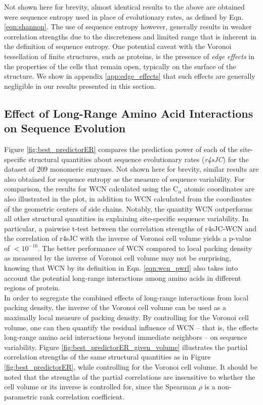 \documentclass[11pt]{article}
\begin{document}
    Not shown here for brevity, almost identical results to the above are obtained were sequence entropy used in place of evolutionary rates, as defined by Eqn. \ref{eqn:shannon}. The use of sequence entropy however, generally results in weaker correlation strengths due to the discreteness and limited range that is inherent in the definition of sequence entropy. One potential caveat with the Voronoi tessellation of finite structures, such as proteins, is the presence of {\it edge effects} in the properties of the cells that remain open, typically on the surface of the structure. We show in appendix \ref{app:edge_effects} that such effects are generally negligible in our results presented in this section. \\

    \subsection*{Effect of Long-Range Amino Acid Interactions on Sequence Evolution}
    \label{sec:long_range}
    Figure \ref{fig:best_predictorER} compares the prediction power of each of the site-specific structural quantities about sequence evolutionary rates ({\it r4sJC}) for the dataset of $209$ monomeric enzymes. Not shown here for brevity, similar results are also obtained for sequence entropy as the measure of sequence variability. For comparison, the results for WCN calculated using the C$_\alpha$ atomic coordinates are also illustrated in the plot, in addition to WCN calculated from the coordinates of the geometric centers of side chains. Notably, the quantity WCN outperforms all other structural quantities in explaining site-specific sequence variability. In particular, a pairwise t-test between the correlation strengths of r4sJC-WCN and the correlation of r4sJC with the inverse of Voronoi cell volume yields a p-value of $<10^{-16}$. The better performance of WCN compared to local packing density as measured by the inverse of Voronoi cell volume may not be surprising, knowing that WCN by its definition in Eqn. \ref{eqn:wcn_pwrl} also takes into account the potential long-range interactions among amino acids in different regions of protein. \\

    In order to segregate the combined effects of long-range interactions from local packing density, the inverse of the Voronoi cell volume can be used as a maximally local measure of packing density. By controlling for the Voronoi cell volume, one can then quantify the residual influence of WCN -- that is, the effects long-range amino acid interactions beyond immediate neighbors -- on sequence variability. Figure \ref{fig:best_predictorER_given_volume} illustrates the partial correlation strengths of the same structural quantities as in Figure \ref{fig:best_predictorER}, while controlling for the Voronoi cell volume. It should be noted that the strengths of the partial correlations are insensitive to whether the cell volume or its inverse is controlled for, since the Spearman $\rho$ is a non-parametric rank correlation coefficient. \\
\end{document}
